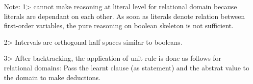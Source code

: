 { Note: 
 1> cannot make reasoning at literal level for relational domain because literals are dependant on each other. As soon as literals denote relation between first-order variables, the pure reasoning on boolean skeleton is not sufficient. 
 
2> Intervals are orthogonal half spaces similar to booleans. 

3> After backtracking, the application of unit rule is done as follows for relational domains:
  Pass the learnt clause (as statement) and the abstrat value to the domain to make deductions.
}
